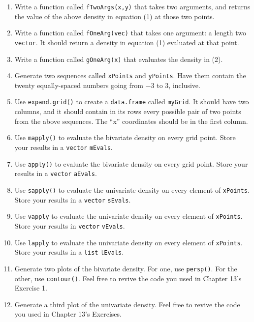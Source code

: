 \documentclass[
  12pt,
  krantz2]{krantz}
\providecommand{\tightlist}{%
  \setlength{\itemsep}{0pt}\setlength{\parskip}{0pt}}
\begin{document}
\begin{enumerate}
\def\labelenumi{\alph{enumi})}
\tightlist
\item
  Write a function called \texttt{fTwoArgs(x,y)} that takes two arguments, and returns the value of the above density in equation (1) at those two points.
\item
  Write a function called \texttt{fOneArg(vec)} that takes one argument: a length two \texttt{vector}. It should return a density in equation (1) evaluated at that point.
\item
  Write a function called \texttt{gOneArg(x)} that evaluates the density in (2).
\item
  Generate two sequences called \texttt{xPoints} and \texttt{yPoints}. Have them contain the twenty equally-spaced numbers going from \(-3\) to \(3\), inclusive.
\item
  Use \texttt{expand.grid()} to create a \texttt{data.frame} called \texttt{myGrid}. It should have two columns, and it should contain in its rows every possible pair of two points from the above sequences. The ``x'' coordinates should be in the first column.
\item
  Use \texttt{mapply()} to evaluate the bivariate density on every grid point. Store your results in a \texttt{vector} \texttt{mEvals}.
\item
  Use \texttt{apply()} to evaluate the bivariate density on every grid point. Store your results in a \texttt{vector} \texttt{aEvals}.
\item
  Use \texttt{sapply()} to evaluate the univariate density on every element of \texttt{xPoints}. Store your results in a \texttt{vector} \texttt{sEvals}.
\item
  Use \texttt{vapply} to evaluate the univariate density on every element of \texttt{xPoints}. Store your results in \texttt{vector} \texttt{vEvals}.
\item
  Use \texttt{lapply} to evaluate the univariate density on every element of \texttt{xPoints}. Store your results in a \texttt{list} \texttt{lEvals}.
\item
  Generate two plots of the bivariate density. For one, use \texttt{persp()}. For the other, use \texttt{contour()}. Feel free to revive the code you used in Chapter 13's Exercise 1.
\item
  Generate a third plot of the univariate density. Feel free to revive the code you used in Chapter 13's Exercises.
\end{enumerate}
\end{document}
